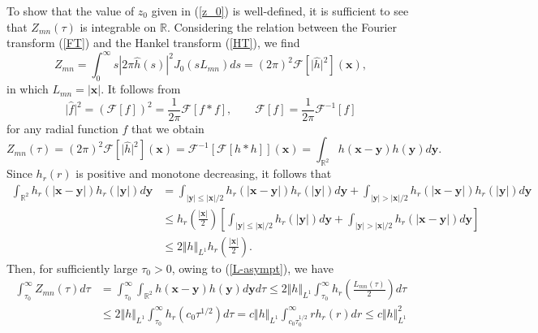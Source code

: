 \documentclass{article}
\theoremstyle{definition}
\begin{document}
To show that the value of $z_0$ given in (\ref{z_0}) is well-defined, it is sufficient to see
 that $Z_{mn}(\tau)$ is integrable on $\mathbb{R}$. Considering the relation between the Fourier transform (\ref{FT}) and the Hankel transform (\ref{HT}), we find
\begin{equation*}
Z_{mn} = \int_0^\infty s \left\vert 2\pi\widehat{h}(s) \right\vert^2  J_0 \left( s L_{mn} \right) ds = (2 \pi)^2 \mathscr{F}\left[ \vert \widehat{h} \vert^2 \right]({\bm x}),
\end{equation*}
in which $L_{mn} = \vert{\bm x}\vert$. It follows from 
\begin{equation*}
\vert \widehat{f} \vert^2 = \left( \mathscr{F}\left[ f \right] \right)^2 = \frac{1}{2 \pi} \mathscr{F}\left[ f \ast f \right], \qquad \mathscr{F}[f] = \frac{1}{2 \pi} \mathscr{F}^{-1}[f]
\end{equation*}
for any radial function $f$ that we obtain
\begin{equation*}
Z_{mn}(\tau) = (2 \pi)^2 \mathscr{F}\left[ \vert \widehat{h}\vert^2 \right]({\bm x}) = \mathscr{F}^{-1}\left[ \mathscr{F}\left[ h \ast h \right] \right]({\bm x}) = \int_{\mathbb{R}^2} h({\bm x} - {\bm y}) h({\bm y}) d{\bm y}.
\end{equation*}
Since $h_r(r)$ is positive and monotone decreasing, it follows that
\begin{align*}
\int_{\mathbb{R}^2} h_r(\vert{\bm x} - {\bm y}\vert) h_r(\vert{\bm y}\vert) d{\bm y} &= \int_{\vert{\bm y}\vert \leq \vert{\bm x}\vert/2} h_r(\vert{\bm x} - {\bm y}\vert) h_r(\vert{\bm y}\vert) d{\bm y} + \int_{\vert{\bm y}\vert > \vert{\bm x}\vert/2} h_r(\vert{\bm x} - {\bm y}\vert) h_r(\vert{\bm y}\vert) d{\bm y} \\
&\leq h_r\left( \frac{\vert{\bm x}\vert}{2} \right)  \left[ \int_{\vert{\bm y}\vert \leq \vert{\bm x}\vert/2} h_r(\vert{\bm y}\vert) d{\bm y} + \int_{\vert{\bm y}\vert > \vert{\bm x}\vert/2} h_r(\vert{\bm x} - {\bm y}\vert)  d{\bm y} \right] \\
&\leq 2 \Vert h \Vert_{L^1} h_r\left( \frac{\vert{\bm x}\vert}{2} \right).
\end{align*}
Then, for sufficiently large $\tau_0 > 0$, owing to (\ref{L-asympt}),  we have
\begin{align*}
\int_{\tau_0}^\infty Z_{mn}(\tau)d\tau &= \int_{\tau_0}^\infty \int_{\mathbb{R}^2} h({\bm x} - {\bm y}) h({\bm y}) d{\bm y} d\tau \leq 2 \Vert h \Vert_{L^1} \int_{\tau_0}^\infty h_r\left( \frac{L_{mn}(\tau)}{2} \right) d\tau  \\
&\leq 2 \Vert h \Vert_{L^1} \int_{\tau_0}^\infty h_r\left( c_0 \tau^{1/2} \right) d\tau = c \Vert h \Vert_{L^1} \int_{c_0 \tau_0^{1/2}}^\infty r h_r(r) dr \leq c \Vert h \Vert_{L^1}^2 
\end{align*}
\end{document}
